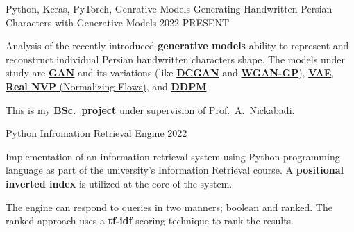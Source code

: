 

\begin{cventries}

  \cventry
    {Python, Keras, PyTorch, Genrative Models} %
    {Generating Handwritten Persian Characters with Generative Models} %
    {} %
    {2022-PRESENT} %
    {
      \begin{cvitems} %
      	\item {Analysis of the recently introduced \textbf{generative models} ability to represent and reconstruct individual Persian handwritten characters shape. The models under study are \href{https://arxiv.org/abs/1406.2661}{\textbf{GAN}} and its variations (like \href{https://arxiv.org/abs/1511.06434}{\textbf{DCGAN}} and \href{https://arxiv.org/abs/1704.00028}{\textbf{WGAN-GP}}), \href{https://arxiv.org/abs/1312.6114}{\textbf{VAE}}, \href{https://arxiv.org/abs/1605.08803}{\textbf{Real NVP} (Normalizing Flows)}, and \href{https://arxiv.org/abs/2006.11239}{\textbf{DDPM}}.}
      	\item {This is my \textbf{BSc.~project} under supervision of Prof.~A.~Nickabadi.}
      \end{cvitems}
    }

  \cventry
    {Python} %
    {\href{https://github.com/radinshayanfar/AUT-IR}{Infromation Retrieval Engine}} %
    {} %
    {2022} %
    {
      \begin{cvitems} %
      	\item {Implementation of an information retrieval system using Python programming language as part of the university's Information Retrieval course. A \textbf{positional inverted index} is utilized at the core of the system.}
      	\item {The engine can respond to queries in two manners; boolean and ranked. The ranked approach uses a \textbf{tf-idf} scoring technique to rank the results.}
      \end{cvitems}
    }
    

\end{cventries}
